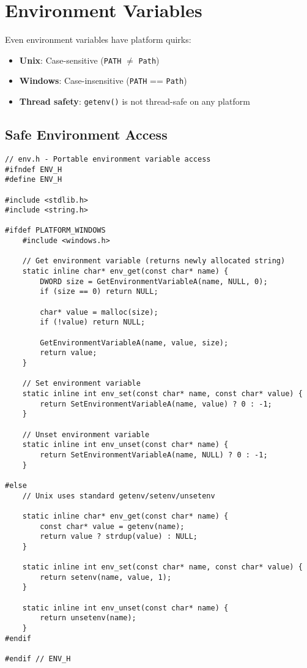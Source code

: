 \section{Environment Variables}

Even environment variables have platform quirks:

\begin{itemize}
    \item \textbf{Unix}: Case-sensitive (\texttt{PATH} $\neq$ \texttt{Path})
    \item \textbf{Windows}: Case-insensitive (\texttt{PATH} == \texttt{Path})
    \item \textbf{Thread safety}: \texttt{getenv()} is not thread-safe on any platform
\end{itemize}

\subsection{Safe Environment Access}

\begin{lstlisting}
// env.h - Portable environment variable access
#ifndef ENV_H
#define ENV_H

#include <stdlib.h>
#include <string.h>

#ifdef PLATFORM_WINDOWS
    #include <windows.h>

    // Get environment variable (returns newly allocated string)
    static inline char* env_get(const char* name) {
        DWORD size = GetEnvironmentVariableA(name, NULL, 0);
        if (size == 0) return NULL;

        char* value = malloc(size);
        if (!value) return NULL;

        GetEnvironmentVariableA(name, value, size);
        return value;
    }

    // Set environment variable
    static inline int env_set(const char* name, const char* value) {
        return SetEnvironmentVariableA(name, value) ? 0 : -1;
    }

    // Unset environment variable
    static inline int env_unset(const char* name) {
        return SetEnvironmentVariableA(name, NULL) ? 0 : -1;
    }

#else
    // Unix uses standard getenv/setenv/unsetenv

    static inline char* env_get(const char* name) {
        const char* value = getenv(name);
        return value ? strdup(value) : NULL;
    }

    static inline int env_set(const char* name, const char* value) {
        return setenv(name, value, 1);
    }

    static inline int env_unset(const char* name) {
        return unsetenv(name);
    }
#endif

#endif // ENV_H
\end{lstlisting}

